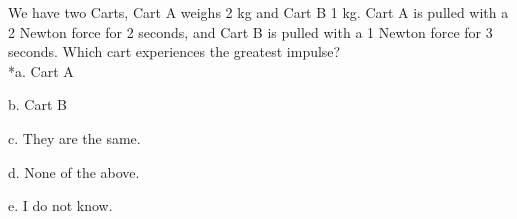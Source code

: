 
We have two Carts,  Cart A weighs 2 kg and Cart B 1 kg. Cart A is pulled with a 2 Newton force for 2 seconds, and Cart B is pulled with a 1 Newton force for 3 seconds.  Which cart experiences the greatest impulse?\\

*a. Cart A 

b. Cart B

c. They are the same.

d. None of the above.

e. I do not know. \\
